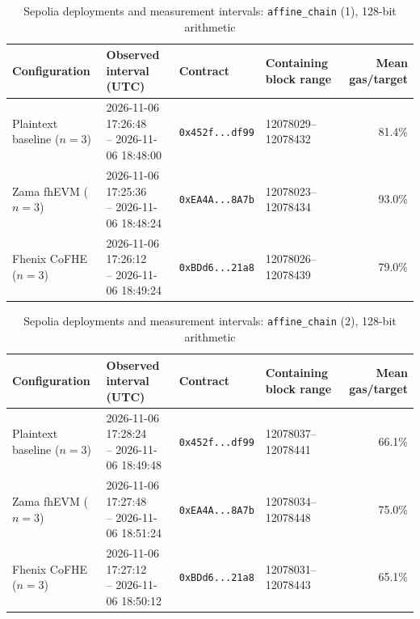\begin{table}[!t]
\caption{Sepolia deployments and measurement intervals: \texttt{affine\_chain} (1), 128-bit arithmetic}
\label{tab:sepolia-experiment-deployments-circuits-euint128-circuits-w128-affine-chain-k1}
\centering
\footnotesize
\setlength{\tabcolsep}{4pt}
\begin{tabular}{|l|l|l|l|r|}
\hline
\textbf{Configuration} &
\textbf{Observed interval (UTC)} &
\textbf{Contract} &
\textbf{Containing block range} &
\textbf{Mean gas/target} \\
\hline
Plaintext baseline (\(n=3\)) &
\shortstack[l]{2026-11-06 17:26:48 \\ -- 2026-11-06 18:48:00} &
\texttt{0x452f...df99} &
12078029--12078432 &
81.4\% \\
\hline
Zama fhEVM (\(n=3\)) &
\shortstack[l]{2026-11-06 17:25:36 \\ -- 2026-11-06 18:48:24} &
\texttt{0xEA4A...8A7b} &
12078023--12078434 &
93.0\% \\
\hline
Fhenix CoFHE (\(n=3\)) &
\shortstack[l]{2026-11-06 17:26:12 \\ -- 2026-11-06 18:49:24} &
\texttt{0xBDd6...21a8} &
12078026--12078439 &
79.0\% \\
\hline
\end{tabular}
\end{table}

\begin{table}[!t]
\caption{Sepolia deployments and measurement intervals: \texttt{affine\_chain} (2), 128-bit arithmetic}
\label{tab:sepolia-experiment-deployments-circuits-euint128-circuits-w128-affine-chain-k2}
\centering
\footnotesize
\setlength{\tabcolsep}{4pt}
\begin{tabular}{|l|l|l|l|r|}
\hline
\textbf{Configuration} &
\textbf{Observed interval (UTC)} &
\textbf{Contract} &
\textbf{Containing block range} &
\textbf{Mean gas/target} \\
\hline
Plaintext baseline (\(n=3\)) &
\shortstack[l]{2026-11-06 17:28:24 \\ -- 2026-11-06 18:49:48} &
\texttt{0x452f...df99} &
12078037--12078441 &
66.1\% \\
\hline
Zama fhEVM (\(n=3\)) &
\shortstack[l]{2026-11-06 17:27:48 \\ -- 2026-11-06 18:51:24} &
\texttt{0xEA4A...8A7b} &
12078034--12078448 &
75.0\% \\
\hline
Fhenix CoFHE (\(n=3\)) &
\shortstack[l]{2026-11-06 17:27:12 \\ -- 2026-11-06 18:50:12} &
\texttt{0xBDd6...21a8} &
12078031--12078443 &
65.1\% \\
\hline
\end{tabular}
\end{table}


